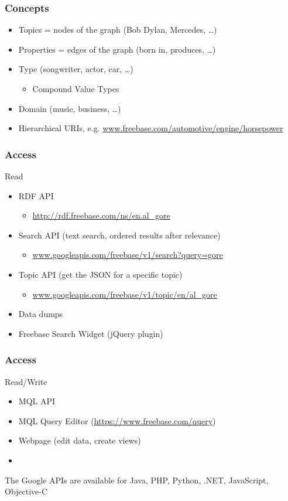 \begin{frame}
\frametitle{Concepts}
\begin{itemize}
  \item Topics = nodes of the graph (Bob Dylan, Mercedes, \ldots)
  \item Properties = edges of the graph (born in, produces, \ldots)
  \item Type (songwriter, actor, car, \ldots)
  \begin{itemize}
    \item Compound Value Types
   \end{itemize}
  \item Domain (music, business, \ldots)
  \item Hierarchical URIs, e.g.
  \url{www.freebase.com/automotive/engine/horsepower}
\end{itemize}
\end{frame}

\begin{frame}
\frametitle{Access}
 Read
  \begin{itemize}
  \item RDF API
  \begin{itemize}
    \item  \url{http://rdf.freebase.com/ns/en.al_gore}
  \end{itemize}
  \item Search API (text search, ordered results after relevance)
  \begin{itemize}
    \item  \url{www.googleapis.com/freebase/v1/search?query=gore}
  \end{itemize}
  \item Topic API (get the JSON for a specific topic)
  \begin{itemize}
    \item  \url{www.googleapis.com/freebase/v1/topic/en/al_gore}
  \end{itemize}
  \item Data dumps
  \item Freebase Search Widget (jQuery plugin)
  \end{itemize}\end{frame}
  \begin{frame}
\frametitle{Access}
  Read/Write
  \begin{itemize}
  \item MQL API
  \item MQL Query Editor (\url{https://www.freebase.com/query})
  \item Webpage (edit data, create views)
  \item[]
  \end{itemize}
  The Google APIs are available for Java, PHP, Python, .NET, JavaScript,
  Objective-C
\end{frame}

